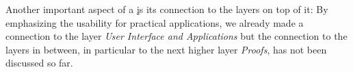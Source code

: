  Another important aspect of a \ul %
 is its connection to the layers on top of it:
 By emphasizing the usability for practical applications, 
 we already made a connection 
 to the layer \emph{User Interface and Applications} but the connection to the layers in between, in particular to the next higher layer \emph{Proofs}, has not been discussed so far.
%
